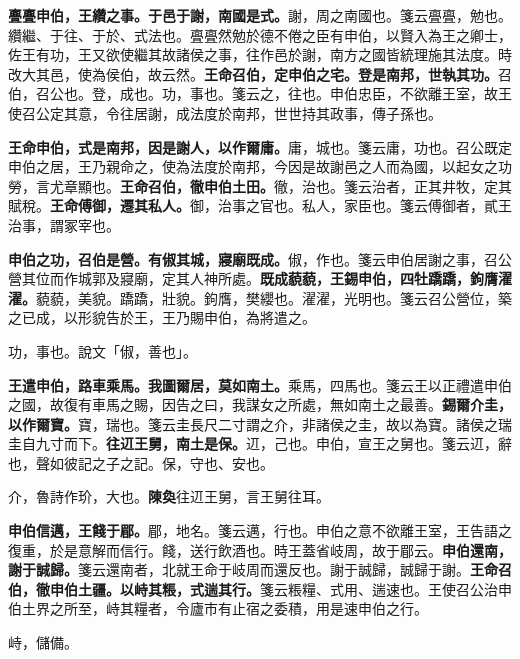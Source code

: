 \textbf{亹亹申伯，王纘之事。于邑于謝，南國是式。}{\footnotesize 謝，周之南國也。箋云亹亹，勉也。纘繼、于往、于於、式法也。亹亹然勉於德不倦之臣有申伯，以賢入為王之卿士，佐王有功，王又欲使繼其故諸侯之事，往作邑於謝，南方之國皆統理施其法度。時改大其邑，使為侯伯，故云然。}\textbf{王命召伯，定申伯之宅。登是南邦，世執其功。}{\footnotesize 召伯，召公也。登，成也。功，事也。箋云之，往也。申伯忠臣，不欲離王室，故王使召公定其意，令往居謝，成法度於南邦，世世持其政事，傳子孫也。}

\textbf{王命申伯，式是南邦，因是謝人，以作爾庸。}{\footnotesize 庸，城也。箋云庸，功也。召公既定申伯之居，王乃親命之，使為法度於南邦，今因是故謝邑之人而為國，以起女之功勞，言尤章顯也。}\textbf{王命召伯，徹申伯土田。}{\footnotesize 徹，治也。箋云治者，正其井牧，定其賦稅。}\textbf{王命傅御，遷其私人。}{\footnotesize 御，治事之官也。私人，家臣也。箋云傅御者，貳王治事，謂冢宰也。}

\textbf{申伯之功，召伯是營。有俶其城，寢廟既成。}{\footnotesize 俶，作也。箋云申伯居謝之事，召公營其位而作城郭及寢廟，定其人神所處。}\textbf{既成藐藐，王錫申伯，四牡蹻蹻，鉤膺濯濯。}{\footnotesize 藐藐，美貌。蹻蹻，壯貌。鉤膺，樊纓也。濯濯，光明也。箋云召公營位，築之已成，以形貌告於王，王乃賜申伯，為將遣之。}

\begin{quoting}功，事也。說文「俶，善也」。\end{quoting}

\textbf{王遣申伯，路車乘馬。我圖爾居，莫如南土。}{\footnotesize 乘馬，四馬也。箋云王以正禮遣申伯之國，故復有車馬之賜，因告之曰，我謀女之所處，無如南土之最善。}\textbf{錫爾介圭，以作爾寶。}{\footnotesize 寶，瑞也。箋云圭長尺二寸謂之介，非諸侯之圭，故以為寶。諸侯之瑞圭自九寸而下。}\textbf{往䢋王舅，南土是保。}{\footnotesize 䢋，己也。申伯，宣王之舅也。箋云䢋，辭也，聲如彼記之子之記。保，守也、安也。}

\begin{quoting}介，魯詩作玠，大也。\textbf{陳奐}往䢋王舅，言王舅往耳。\end{quoting}

\textbf{申伯信邁，王餞于郿。}{\footnotesize 郿，地名。箋云邁，行也。申伯之意不欲離王室，王告語之復重，於是意解而信行。餞，送行飲酒也。時王蓋省岐周，故于郿云。}\textbf{申伯還南，謝于誠歸。}{\footnotesize 箋云還南者，北就王命于岐周而還反也。謝于誠歸，誠歸于謝。}\textbf{王命召伯，徹申伯土疆。以峙其粻，式遄其行。}{\footnotesize 箋云粻糧、式用、遄速也。王使召公治申伯土界之所至，峙其糧者，令廬巿有止宿之委積，用是速申伯之行。}

\begin{quoting}峙，儲備。\end{quoting}

